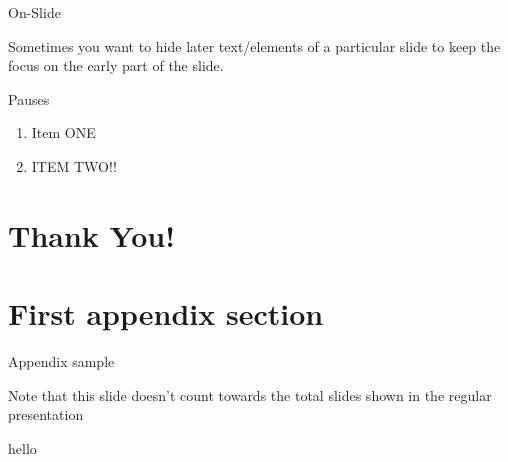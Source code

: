 \documentclass[12pt, aspectratio = 169]{beamer}
\begin{document}
\begin{frame}{On-Slide}

	Sometimes you want to hide later text/elements of a particular slide to keep the focus on the early part of the slide.

	\bigskip


\end{frame}
\begin{frame}{Pauses}
\begin{enumerate}
\item Item ONE
\pause
\item ITEM TWO!! 
\end{enumerate}
\end{frame}


\appendix

\section{Thank You!}
{\BackgroundShaded
\begin{frame}
\end{frame}
}






\section{First appendix section}

\begin{frame}{Appendix sample}

	Note that this slide doesn't count towards the total slides shown in the regular presentation

\end{frame}

\begin{frame}{hello}
    
\end{frame}

\end{document}
